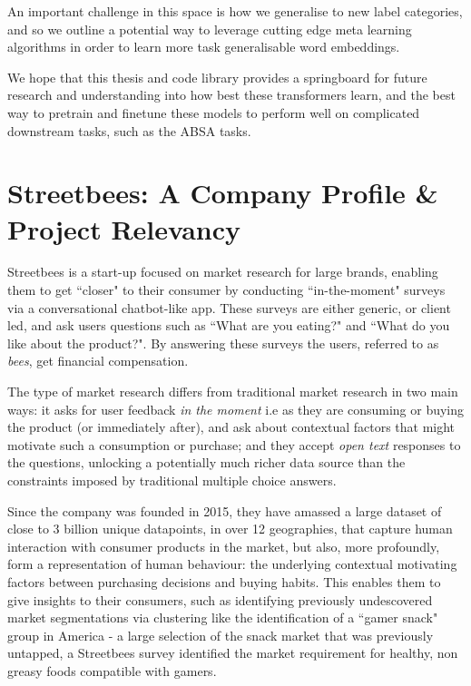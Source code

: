 \documentclass[11pt]{report}
\def \thesistitle {Multitask \& Meta Learning for Language Models}
\renewcommand{\headrulewidth}{0.4pt}
\theoremstyle{Definition}
\theoremstyle{remark}
\begin{document}
An important challenge in this space is how we generalise to new label categories, and so we outline a potential way to leverage cutting edge meta learning algorithms in order to learn more task generalisable word embeddings.

We hope that this thesis and code library provides a springboard for future research and understanding into how best these transformers learn, and the best way to pretrain and finetune these models to perform well on complicated downstream tasks, such as the ABSA tasks.

\appendix
\chapter{Streetbees: A Company Profile \& Project Relevancy}
\label{appendix:streetbees}
\fancyhf{}
\fancyhead[R]{\slshape\nouppercase{\thesistitle}}
\renewcommand{\headrulewidth}{0.4pt}
\fancyfoot[C]{\thepage}
Streetbees is a start-up focused on market research for large brands, enabling them to get ``closer" to their consumer by conducting ``in-the-moment" surveys via a conversational chatbot-like app. These surveys are either generic, or client led, and ask users questions such as ``What are you eating?" and ``What do you like about the product?". By answering these surveys the users, referred to as \textit{bees}, get financial compensation. 

The type of market research differs from traditional market research in two main ways: it asks for user feedback \textit{in the moment} i.e as they are consuming or buying the product (or immediately after), and ask about contextual factors that might motivate such a consumption or purchase; and they accept \textit{open text} responses to the questions, unlocking a potentially much richer data source than the constraints imposed by traditional multiple choice answers.

Since the company was founded in 2015, they have amassed a large dataset of close to 3 billion unique datapoints, in over 12 geographies, that capture human interaction with consumer products in the market, but also, more profoundly, form a representation of human behaviour: the underlying contextual motivating factors between purchasing decisions and buying habits. This enables them to give insights to their consumers, such as identifying previously undescovered market segmentations via clustering like the identification of a ``gamer snack" group in America - a large selection of the snack market that was previously untapped, a Streetbees survey identified the market requirement for healthy, non greasy foods compatible with gamers. 
\end{document}
